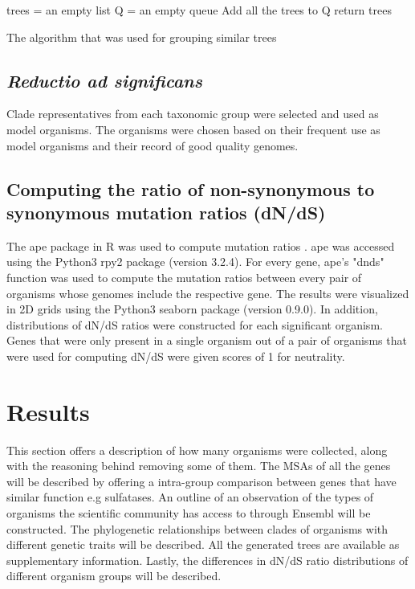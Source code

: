 \documentclass{article}
\begin{document}
\begin{algorithm}[h!]
\SetAlgoLined
{}
trees = an empty list\;
Q = an empty queue\;
Add all the trees to Q\;
return trees\;
\caption{The algorithm that was used for grouping similar trees}
\label{alg_1}
\end{algorithm}

\subsection{\textit{Reductio ad significans}}
Clade representatives from each taxonomic group were selected and used as model organisms. The organisms were chosen based on their frequent use as model organisms and their record of good quality genomes.

\subsection{Computing the ratio of non-synonymous to synonymous mutation ratios (dN/dS)}
The ape package in R was used to compute mutation ratios \cite{ape}. ape was accessed using the Python3 rpy2 package (version 3.2.4). For every gene, ape's "dnds" function was used to compute the mutation ratios between every pair of organisms whose genomes include the respective gene. The results were visualized in 2D grids using the Python3 seaborn package (version 0.9.0). In addition, distributions of dN/dS ratios were constructed for each significant organism. Genes that were only present in a single organism out of a pair of organisms that were used for computing dN/dS were given scores of 1 for neutrality.

\section{Results}
This section offers a description of how many organisms were collected, along with the reasoning behind removing some of them. The MSAs of all the genes will be described by offering a intra-group comparison between genes that have similar function e.g sulfatases. An outline of an observation of the types of organisms the scientific community has access to through Ensembl will be constructed. The phylogenetic relationships between clades of organisms with different genetic traits will be described. All the generated trees are available as supplementary information. Lastly, the differences in dN/dS ratio distributions of different organism groups will be described. 
\end{document}

